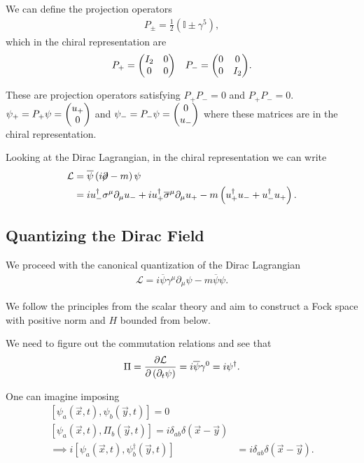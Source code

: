 We can define the projection operators
\begin{align}
    P_{\pm} = \frac{1}{2} \left( \mathbb{I} \pm \gamma^{5} \right) 
,\end{align}
which in the chiral representation are
\begin{align}
    P_+ = \mqty( I_2 & 0 \\ 0 & 0 ) && P_- = \mqty( 0 & 0 \\ 0 & I_2)
.\end{align}

These are projection operators satisfying $P_+ P_- = 0$ and $P_+ P_- = 0$. $\psi_+ = P_+ \psi = \mqty( u_+ \\ 0 )$ and $\psi_- = P_- \psi = \mqty( 0 \\ u_-)$ where these matrices are in the chiral representation.

Looking at the Dirac Lagrangian,  in the chiral representation we can write
\begin{align}
    \mathcal{L} &= \overline{\psi} \left( i \fbs{\partial} - m \right) \psi \\
    &= i u_-^{\dag} \sigma^{\mu} \partial_\mu u_- + i u_+^{\dag} \overline{\sigma}^\mu \partial_\mu u_+ - m \left( u_+^{\dag} u_- + u_-^{\dag} u_{+} \right)  
.\end{align}

\subsection{Quantizing the Dirac Field}

We proceed with the canonical quantization of the Dirac Lagrangian
\begin{align}
    \mathcal{L} = i \overline{\psi}\gamma^{\mu} \partial_\mu \psi - m \overline{\psi}\psi
.\end{align}

We follow the principles from the scalar theory and aim to construct a Fock space with positive norm and $H$ bounded from below.

We need to figure out the commutation relations and see that
\begin{align}
    \Pi = \pdv{\mathcal{L}}{\left( \partial_t \psi \right) } = i \overline{\psi} \gamma^{0} = i \psi^{\dag}
.\end{align}

One can imagine imposing
\begin{align}
    \left[ \psi_a \left( \vec{x},t \right) , \psi_b \left( \vec{y},t \right)  \right] = 0 \\
    \left[ \psi_a \left( \vec{x},t \right) , \Pi_b \left( \vec{y},t \right)  \right] = i \delta_{ab} \delta \left( \vec{x} - \vec{y} \right)  \\
    \implies i\left[ \psi_a \left( \vec{x},t \right) , \psi_b^{\dag} \left( \vec{y},t \right)  \right] &= i \delta_{ab} \delta \left( \vec{x} - \vec{y} \right) 
.\end{align}

